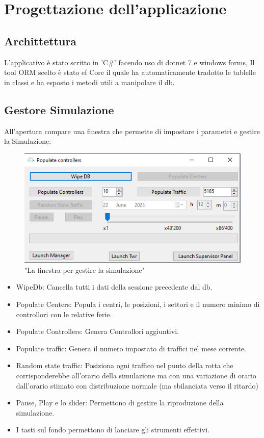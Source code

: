 \chapter{Progettazione dell'applicazione}
\section{Archittettura}
L'applicativo è stato scritto in 'C\#' facendo uso di dotnet 7 e windows forms,
Il tool ORM scelto è stato ef Core il quale ha automaticamente tradotto le tablelle in classi e ha esposto i metodi utili a manipolare il db.
\section{Gestore Simulazione}
All'apertura compare una finestra che permette di impostare i parametri e gestire la Simulazione:
\begin{figure}[H]
     \centering
     \includegraphics[width=1\textwidth]{figures/Sim.PNG}
     \caption{"La finestra per gestire la simulazione"}
   \end{figure}

\begin{itemize}
     \item WipeDb: Cancella tutti i dati della sessione precedente dal db.
     \item Populate Centers: Popula i centri, le posizioni, i settori e il numero minimo di controllori con le relative ferie.
     \item Populate Controllers: Genera Controllori aggiuntivi.
     \item Populate traffic: Genera il numero impostato di traffici nel mese corrente.
     \item Random state traffic: Posiziona ogni traffico nel punto della rotta che corrisponderebbe all'orario della simulazione ma con una variazione di orario dall'orario stimato con distribuzione normale (ma sbilanciata verso il ritardo)
     \item Pause, Play e lo slider: Permettono di gestire la riproduzione della simulazione.
     \item I tasti sul fondo permettono di lanciare gli strumenti effettivi. 
\end{itemize}
